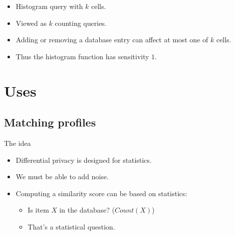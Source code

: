 \begin{frame}
  \begin{example}[Histograms]
    \begin{itemize}
      \item Histogram query with \(k\) cells.

        \pause{}

      \item Viewed as \(k\) counting queries.

        \pause{}

      \item Adding or removing a database entry can affect at most one of \(k\)
        cells.

        \pause{}

      \item Thus the histogram function has sensitivity \(1\).
    \end{itemize}
  \end{example}
\end{frame}


\section{Uses}

\subsection{Matching profiles}

\begin{frame}
  \begin{block}{The idea}
    \begin{itemize}
      \item Differential privacy is designed for statistics.
      \item {\color{red} We must be able to add noise.}

        \pause

      \item Computing a similarity score can be based on statistics:
        \begin{itemize}
          \item Is item \(X\) in the database? (\(Count(X)\))
          \item That's a statistical question.
        \end{itemize}
    \end{itemize}
  \end{block}
\end{frame}

